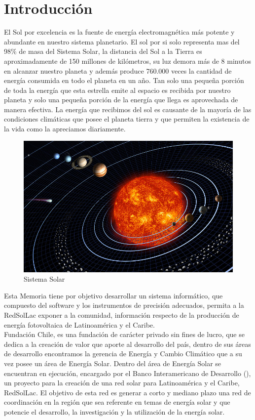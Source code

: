 \chapter{Introducción}
\label{ch:introduccion}

El Sol por excelencia es la fuente de energía electromagnética más potente y abundante en nuestro sistema planetario. El sol por si solo representa mas del 98\% de masa del Sistema Solar, la distancia del Sol a la Tierra es aproximadamente de 150 millones de kilómetros, su luz demora más de 8 minutos en alcanzar nuestro planeta y además produce 760.000 veces la cantidad de energía consumida en todo el planeta en un año. Tan solo una pequeña porción de toda la energía que esta estrella emite al espacio es recibida por nuestro planeta y solo una pequeña porción de la energía que llega es aprovechada de manera efectiva. La energía que recibimos del sol es causante de la mayoría de las condiciones climáticas que posee el planeta tierra y que permiten la existencia de la vida como la apreciamos diariamente.\\

\begin{figure}[h!]
        \centering
        \includegraphics[scale=0.35]{images/solarSis}
        \caption{Sistema Solar}
\end{figure}

Esta Memoria tiene por objetivo desarrollar un sistema informático, que compuesto del software y los instrumentos de precisión adecuados, permita a la RedSolLac exponer a la comunidad, información respecto de la producción de energía fotovoltaica de Latinoamérica y el Caribe.\\ 
	
Fundación Chile, es una fundación de carácter privado sin fines de lucro, que se dedica a la creación de valor que aporte al desarrollo del país, dentro de sus áreas de desarrollo encontramos la gerencia de Energía y Cambio Climático que a su vez posee un área de Energía Solar. Dentro del área de Energía Solar se encuentran en ejecución, encargado por el Banco Interamericano de Desarrollo (), un proyecto para la creación de una red solar para Latinoamérica y el Caribe, RedSolLac\cite{redSolLac:1}. El objetivo de esta red es generar a corto y mediano plazo una red de coordinación en la región que sea referente en temas de energía solar y que potencie el desarrollo, la investigación y la utilización de la energía solar.\\
 

